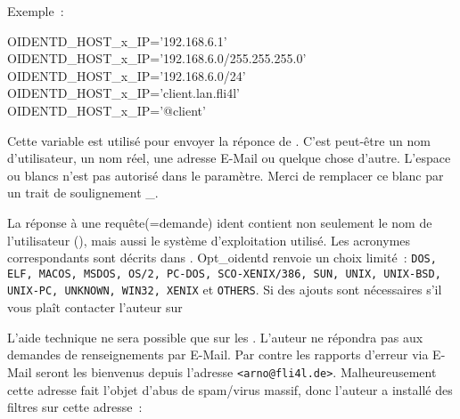 \begin{description}
  Exemple~:

  \begin{example}
  OIDENTD\_HOST\_x\_IP='192.168.6.1'\\
  OIDENTD\_HOST\_x\_IP='192.168.6.0/255.255.255.0'\\
  OIDENTD\_HOST\_x\_IP='192.168.6.0/24'\\
  OIDENTD\_HOST\_x\_IP='client.lan.fli4l'\\
  OIDENTD\_HOST\_x\_IP='@client'
  \end{example}



  Cette variable  est utilisé pour envoyer la réponce
  de . C'est peut-être un nom d'utilisateur,  un nom réel, une adresse
  \mbox{E-Mail} ou quelque chose d'autre. L'espace ou blancs n'est pas autorisé dans
  le paramètre. Merci de remplacer ce blanc par un trait de soulignement \_.


  La réponse à une requête(=demande) ident contient non seulement le nom de
  l'utilisateur (), mais aussi le système
  d'exploitation utilisé. Les acronymes correspondants sont décrits dans
  . Opt\_oidentd renvoie un choix limité~: 
  \texttt{DOS, ELF, MACOS, MSDOS, OS/2, PC-DOS, SCO-XENIX/386, SUN, UNIX,
  UNIX-BSD, UNIX-PC, UNKNOWN, WIN32, XENIX} et \texttt{OTHERS}. Si des
  ajouts sont nécessaires s'il vous plaît contacter l'auteur sur

\end{description}


L'aide technique ne sera possible que sur les .
L'auteur ne répondra pas aux demandes de renseignements par \mbox{E-Mail}. Par contre
les rapports d'erreur via \mbox{E-Mail} seront les bienvenus depuis l'adresse
\texttt{<arno@fli4l.de>}. Malheureusement cette adresse fait l'objet d'abus de
spam/virus massif, donc l'auteur a installé des filtres sur cette adresse~:

